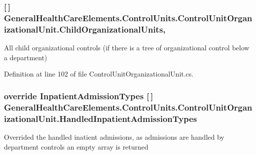 \subsubsection[{\texorpdfstring{Child\+Organizational\+Units}{ChildOrganizationalUnits}}]{ \mbox{[}$\,$\mbox{]} General\+Health\+Care\+Elements.\+Control\+Units.\+Control\+Unit\+Organizational\+Unit.\+Child\+Organizational\+Units\hspace{0.3cm}{\ttfamily [get]}, {\ttfamily [set]}}\hypertarget{class_general_health_care_elements_1_1_control_units_1_1_control_unit_organizational_unit_a5eb9910659ae60ac374271113d88b8e5}{}\label{class_general_health_care_elements_1_1_control_units_1_1_control_unit_organizational_unit_a5eb9910659ae60ac374271113d88b8e5}


All child organizational controls (if there is a tree of organizational control below a department) 



Definition at line 102 of file Control\+Unit\+Organizational\+Unit.\+cs.

\subsubsection[{\texorpdfstring{Handled\+Inpatient\+Admission\+Types}{HandledInpatientAdmissionTypes}}]{\setlength{\rightskip}{0pt plus 5cm}override {\bf Inpatient\+Admission\+Types} \mbox{[}$\,$\mbox{]} General\+Health\+Care\+Elements.\+Control\+Units.\+Control\+Unit\+Organizational\+Unit.\+Handled\+Inpatient\+Admission\+Types\hspace{0.3cm}{\ttfamily [get]}}\hypertarget{class_general_health_care_elements_1_1_control_units_1_1_control_unit_organizational_unit_ab60c7e9972cb08682a2aa3c2498f8225}{}\label{class_general_health_care_elements_1_1_control_units_1_1_control_unit_organizational_unit_ab60c7e9972cb08682a2aa3c2498f8225}


Overrided the handled inatient admissions, as admissions are handled by department controls an empty array is returned 




